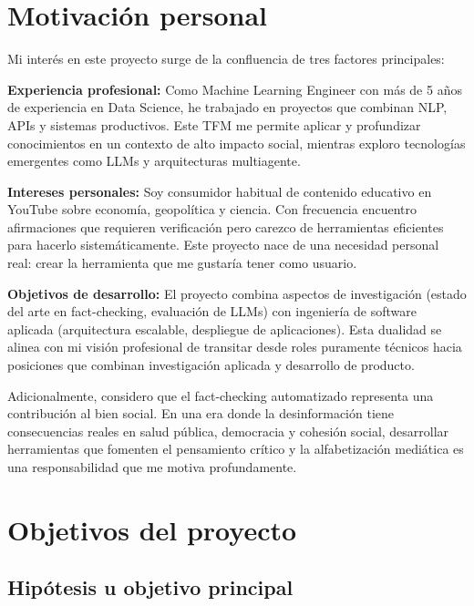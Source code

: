 \documentclass[12pt,a4paper]{article}
\begin{document}
\section{Motivación personal}

Mi interés en este proyecto surge de la confluencia de tres factores principales:

\textbf{Experiencia profesional:} Como Machine Learning Engineer con más de 5 años de experiencia en Data Science, he trabajado en proyectos que combinan NLP, APIs y sistemas productivos. Este TFM me permite aplicar y profundizar conocimientos en un contexto de alto impacto social, mientras exploro tecnologías emergentes como LLMs y arquitecturas multiagente.

\textbf{Intereses personales:} Soy consumidor habitual de contenido educativo en YouTube sobre economía, geopolítica y ciencia. Con frecuencia encuentro afirmaciones que requieren verificación pero carezco de herramientas eficientes para hacerlo sistemáticamente. Este proyecto nace de una necesidad personal real: crear la herramienta que me gustaría tener como usuario.

\textbf{Objetivos de desarrollo:} El proyecto combina aspectos de investigación (estado del arte en fact-checking, evaluación de LLMs) con ingeniería de software aplicada (arquitectura escalable, despliegue de aplicaciones). Esta dualidad se alinea con mi visión profesional de transitar desde roles puramente técnicos hacia posiciones que combinan investigación aplicada y desarrollo de producto.

Adicionalmente, considero que el fact-checking automatizado representa una contribución al bien social. En una era donde la desinformación tiene consecuencias reales en salud pública, democracia y cohesión social, desarrollar herramientas que fomenten el pensamiento crítico y la alfabetización mediática es una responsabilidad que me motiva profundamente.

\section{Objetivos del proyecto}

\subsection{Hipótesis u objetivo principal}
\end{document}
